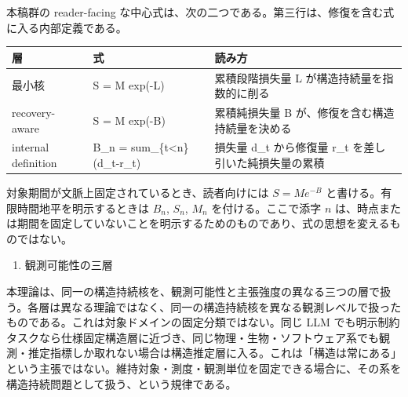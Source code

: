 \documentclass[12pt,a4paper]{article}
\begin{document}
本稿群の reader-facing な中心式は、次の二つである。第三行は、修復を含む式に入る内部定義である。

{\def\LTcaptype{table} %
\begin{longtable}[]{@{}
  >{\raggedright\arraybackslash}p{}
  >{\raggedright\arraybackslash}p{}
  >{\raggedright\arraybackslash}p{}@{}}
\toprule\noalign{}
\begin{minipage}[b]{\linewidth}\raggedright
層
\end{minipage} & \begin{minipage}[b]{\linewidth}\raggedright
式
\end{minipage} & \begin{minipage}[b]{\linewidth}\raggedright
読み方
\end{minipage} \\
\midrule\noalign{}
\endhead
\bottomrule\noalign{}
\endlastfoot
最小核 & S = M exp(-L) & 累積段階損失量 L が構造持続量を指数的に削る \\
recovery-aware & S = M exp(-B) & 累積純損失量 B が、修復を含む構造持続量を決める \\
internal definition & B\_n = sum\_\{t\textless n\}(d\_t-r\_t) & 損失量 d\_t から修復量 r\_t を差し引いた純損失量の累積 \\
\end{longtable}
}

対象期間が文脈上固定されているとき、読者向けには \(S=Me^{-B}\) と書ける。有限時間地平を明示するときは \(B_{n}\), \(S_{n}\), \(M_{n}\) を付ける。ここで添字 \(n\) は、時点または期間を固定していないことを明示するためのものであり、式の思想を変えるものではない。

\begin{enumerate}
\def\labelenumi{\arabic{enumi}.}
\setcounter{enumi}{5}
\tightlist
\item
  観測可能性の三層
\end{enumerate}

本理論は、同一の構造持続核を、観測可能性と主張強度の異なる三つの層で扱う。各層は異なる理論ではなく、同一の構造持続核を異なる観測レベルで扱ったものである。これは対象ドメインの固定分類ではない。同じ LLM でも明示制約タスクなら仕様固定構造層に近づき、同じ物理・生物・ソフトウェア系でも観測・推定指標しか取れない場合は構造推定層に入る。これは「構造は常にある」という主張ではない。維持対象・測度・観測単位を固定できる場合に、その系を構造持続問題として扱う、という規律である。
\end{document}

